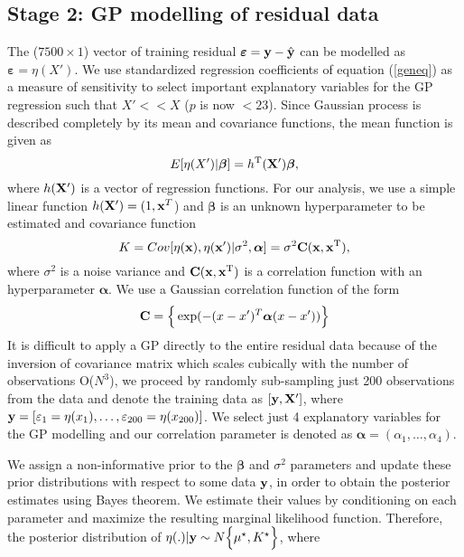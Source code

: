 \documentclass[12pt,titlepage]{report}
\newcommand{\bC}{{\bf C}}
\newcommand{\bx}{{\bf x}}
\newcommand{\bX}{{\bf X}}
\newcommand{\by}{{\bf y}}
\newcommand{\hby}{{\hat {\bf y}}}
\theoremstyle{definition}
\theoremstyle{remark}
\begin{document}
\subsection*{Stage 2: GP modelling of residual data}
The (${7500\times 1}$) vector of training residual $\boldsymbol \varepsilon=\by-\hby$ can be modelled as $\boldsymbol \varepsilon= \eta(X')$. We use standardized regression coefficients of equation (\ref{geneq}) as a measure of sensitivity to select important explanatory variables for the GP regression such that $X'<< X$ ($p$ is now $<23$).
Since Gaussian process is described completely by its mean and covariance functions, the mean function is given as
\begin{equation}\label{eqgp3}
E[\eta(X')|\boldsymbol\beta]=h^{\rm T}(\bX')\boldsymbol\beta,
\end{equation}
where $h(\bX')$ is a vector of regression functions. For our analysis, we use a simple linear function $h(\bX') = (1,\bx^T$) and $\boldsymbol\beta$ is an unknown hyperparameter to be estimated and covariance function $$ K={Cov[\eta(\bx),\eta(\bx')|\sigma^{2},\boldsymbol \alpha]=\sigma^{2} \bC(\bx,\bx^{\rm T})},$$ where $\sigma^{2}$ is a noise variance and $\bC(\bx,\bx^{\rm T})$ is a correlation function with an hyperparameter $\boldsymbol \alpha$. We use a Gaussian correlation function of the form
\begin{equation}
\bC=\Big \{\exp(-(x-x')^T \boldsymbol \alpha (x-x')) \Big\}%
\end{equation}
It is difficult to apply a GP directly to the entire residual data because of the inversion of covariance matrix which scales cubically with the number of
observations O($N^3$), we proceed by randomly sub-sampling just 200 observations from the data and denote the training data as $[\by, \bX']$, where $\by=[ \varepsilon_1= \eta(x_1),\ldots, \varepsilon_{200}= \eta(x_{200})]$. We select just 4 explanatory variables for the GP modelling and our correlation parameter is denoted as $\boldsymbol \alpha=(\alpha_1,\ldots,\alpha_4)$.

We assign a non-informative prior to the $\boldsymbol \beta$ and $\sigma^2$ parameters and update these prior distributions with respect to some data $\by$, in order to obtain the posterior estimates using Bayes theorem. We estimate their values by conditioning on each parameter and maximize the resulting marginal likelihood function. Therefore, the posterior distribution of $\eta(.)|\by \sim N\Big \{\mu^{\star}, K^{\star} \Big\}$, where
\end{document}
